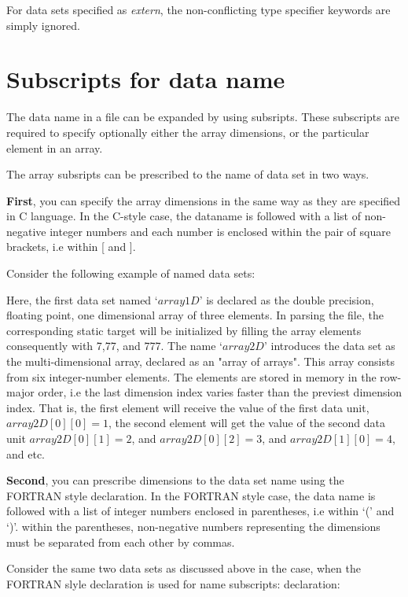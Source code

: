 For data sets specified as {\it extern}, 
the non-conflicting type specifier keywords
are simply ignored.

\section{Subscripts for data name}

The data name in a file can be expanded by using subsripts.
These subscripts are required to specify optionally 
either the array dimensions, or
the particular element in an array.

The array subsripts can be prescribed to the name of data set
in two ways.

{\bf First}, you can specify the array dimensions in the same way
as they are specified in  C language.
In the C-style case, the dataname is followed with
a list of non-negative integer numbers 
and each number is enclosed within the pair of square brackets,
i.e within [ and ]. 

Consider the following example of named data sets:
 


Here, the first data set named `$array1D$' is declared as the double precision,
floating point, one dimensional
array of three elements. 
In parsing the file,
the corresponding static target will be
initialized by filling the array elements consequently with  7,77, and 777.  
The name `$array2D$' introduces the data set as the multi-dimensional array,
declared as an "array of arrays". 
This array consists from six integer-number elements. 
The elements are stored in memory in the row-major order, i.e the last
dimension index varies faster than the previest dimension index.
That is, the first element will receive the value of the first data unit,
$array2D[0][0]=1$, the second element will get the value of the second data unit
$array2D[0][1]=2$, and $array2D[0][2]=3$, and $array2D[1][0]=4$, and etc.

{\bf Second}, you can prescribe dimensions to the data set name
using the FORTRAN style declaration.
In the FORTRAN style case, the data name is followed with 
a list of integer numbers enclosed in parentheses, i.e within `(' and `)'. 
within the parentheses, non-negative numbers representing 
the dimensions must be separated from each other by commas.

Consider the same two data sets as discussed above
in the case, when the FORTRAN slyle declaration is used
for name subscripts:
declaration:
 
